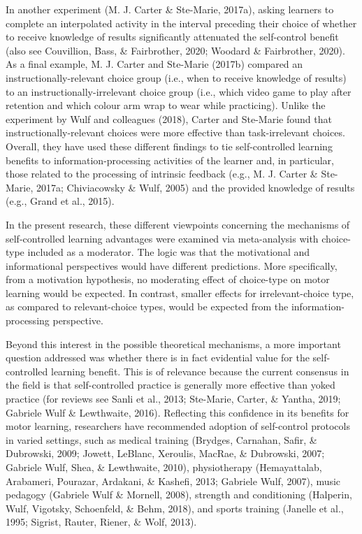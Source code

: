 \documentclass[
  english,
  man,floatsintext]{apa7}
\begin{document}
In another experiment (M. J. Carter \& Ste-Marie, 2017a), asking learners to complete an interpolated activity in the interval preceding their choice of whether to receive knowledge of results significantly attenuated the self-control benefit (also see Couvillion, Bass, \& Fairbrother, 2020; Woodard \& Fairbrother, 2020). As a final example, M. J. Carter and Ste-Marie (2017b) compared an instructionally-relevant choice group (i.e., when to receive knowledge of results) to an instructionally-irrelevant choice group (i.e., which video game to play after retention and which colour arm wrap to wear while practicing). Unlike the experiment by Wulf and colleagues (2018), Carter and Ste-Marie found that instructionally-relevant choices were more effective than task-irrelevant choices. Overall, they have used these different findings to tie self-controlled learning benefits to information-processing activities of the learner and, in particular, those related to the processing of intrinsic feedback (e.g., M. J. Carter \& Ste-Marie, 2017a; Chiviacowsky \& Wulf, 2005) and the provided knowledge of results (e.g., Grand et al., 2015).

In the present research, these different viewpoints concerning the mechanisms of self-controlled learning advantages were examined via meta-analysis with choice-type included as a moderator. The logic was that the motivational and informational perspectives would have different predictions. More specifically, from a motivation hypothesis, no moderating effect of choice-type on motor learning would be expected. In contrast, smaller effects for irrelevant-choice type, as compared to relevant-choice types, would be expected from the information-processing perspective.

Beyond this interest in the possible theoretical mechanisms, a more important question addressed was whether there is in fact evidential value for the self-controlled learning benefit. This is of relevance because the current consensus in the field is that self-controlled practice is generally more effective than yoked practice (for reviews see Sanli et al., 2013; Ste-Marie, Carter, \& Yantha, 2019; Gabriele Wulf \& Lewthwaite, 2016). Reflecting this confidence in its benefits for motor learning, researchers have recommended adoption of self-control protocols in varied settings, such as medical training (Brydges, Carnahan, Safir, \& Dubrowski, 2009; Jowett, LeBlanc, Xeroulis, MacRae, \& Dubrowski, 2007; Gabriele Wulf, Shea, \& Lewthwaite, 2010), physiotherapy (Hemayattalab, Arabameri, Pourazar, Ardakani, \& Kashefi, 2013; Gabriele Wulf, 2007), music pedagogy (Gabriele Wulf \& Mornell, 2008), strength and conditioning (Halperin, Wulf, Vigotsky, Schoenfeld, \& Behm, 2018), and sports training (Janelle et al., 1995; Sigrist, Rauter, Riener, \& Wolf, 2013).
\end{document}
